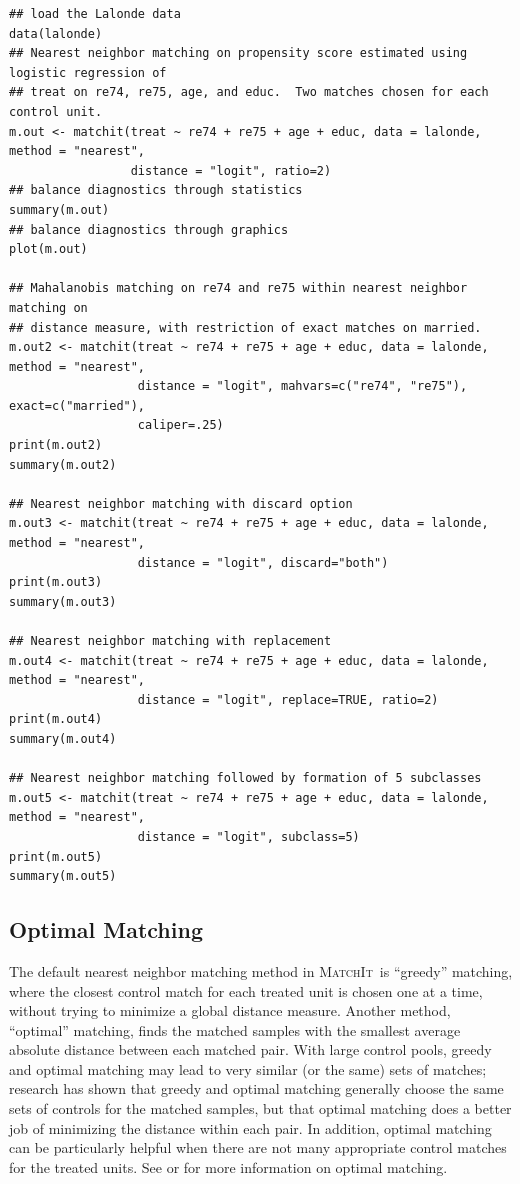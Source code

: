 \documentclass[oneside,letterpaper,titlepage]{article}
\newcommand{\MatchIt}{\textsc{MatchIt}}
\begin{document}
\begin{verbatim}
## load the Lalonde data
data(lalonde)
## Nearest neighbor matching on propensity score estimated using logistic regression of
## treat on re74, re75, age, and educ.  Two matches chosen for each control unit.
m.out <- matchit(treat ~ re74 + re75 + age + educ, data = lalonde, method = "nearest", 
                 distance = "logit", ratio=2)
## balance diagnostics through statistics
summary(m.out)
## balance diagnostics through graphics
plot(m.out)

## Mahalanobis matching on re74 and re75 within nearest neighbor matching on 
## distance measure, with restriction of exact matches on married.
m.out2 <- matchit(treat ~ re74 + re75 + age + educ, data = lalonde, method = "nearest", 
                  distance = "logit", mahvars=c("re74", "re75"), exact=c("married"), 
                  caliper=.25)
print(m.out2)
summary(m.out2)

## Nearest neighbor matching with discard option
m.out3 <- matchit(treat ~ re74 + re75 + age + educ, data = lalonde, method = "nearest", 
                  distance = "logit", discard="both")
print(m.out3)
summary(m.out3)

## Nearest neighbor matching with replacement
m.out4 <- matchit(treat ~ re74 + re75 + age + educ, data = lalonde, method = "nearest", 
                  distance = "logit", replace=TRUE, ratio=2)
print(m.out4)
summary(m.out4)

## Nearest neighbor matching followed by formation of 5 subclasses
m.out5 <- matchit(treat ~ re74 + re75 + age + educ, data = lalonde, method = "nearest", 
                  distance = "logit", subclass=5)
print(m.out5)
summary(m.out5)
\end{verbatim}

\subsection{Optimal Matching}
\label{optmatch}

The default nearest neighbor matching method in \MatchIt\ is
``greedy'' matching, where the closest control match for each treated
unit is chosen one at a time, without trying to minimize a global
distance measure.  Another method, ``optimal'' matching, finds the
matched samples with the smallest average absolute 
distance between each matched pair.  With large control pools, greedy
and optimal matching may lead to very similar (or the same) sets of
matches; research \citep{GuRos93} has shown that greedy and optimal
matching generally choose the same sets of controls for the matched
samples, but that optimal matching does a better job of minimizing the
distance within each pair.  In addition, optimal
matching can be particularly helpful when there are not many
appropriate control matches for the treated units.  See \cite{GuRos93}
or \cite{Rosenbaum02} for more information on optimal matching.
\end{document}
